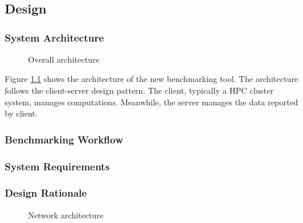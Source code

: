\chapter{\chImplementation}
\label{ch:implementation}

\section{Design}

\subsection{System Architecture}

\begin{figure}
    \centering
    
    \caption{Overall architecture}
    \label{fig:architecture}
\end{figure}

Figure \ref{fig:architecture} shows the architecture of the new benchmarking tool.
The architecture follows the client-server design pattern.
The client, typically a HPC cluster system, manages computations.
Meanwhile, the server manages the data reported by client.

\subsection{Benchmarking Workflow}
\subsection{System Requirements}
\subsection{Design Rationale}



\begin{figure}
    
    \caption{Network architecture}
\end{figure}

